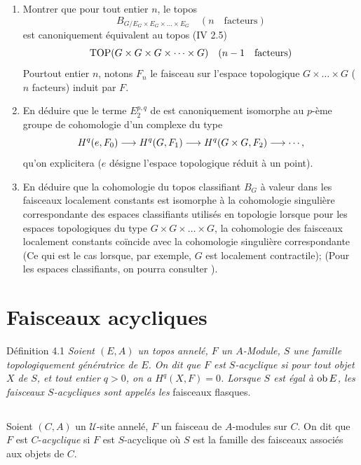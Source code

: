 \documentclass[10pt]{../fichiers-configuration-latex/smfart}
\begin{document}
\begin{enumerate}
\renewcommand{\labelenumi}{\theenumi)}
\item Montrer que pour tout entier $n$, le topos
$$
B_{G/ E_G \times E_G \times \ldots \times E_G}\quad (n\quad \mbox{facteurs})
$$
est canoniquement équivalent au topos (IV 2.5)
$$
\operatorname{TOP} (G \times G \times G \times \dots \times G)\quad (n - 1\quad
\mbox{facteurs})
$$
Pour\pageoriginale tout entier $n$, notons $F_n$ le faisceau sur l'espace
topologique $G \times \ldots \times G$ ($n$ facteurs) induit par $F$.

\item En déduire que le terme $E^{p, q}_2$ de  est
  canoniquement isomorphe au $p$-ème groupe de cohomologie d'un
  complexe du type
$$
H^{q}(e, F_{0}) \to H^{q}(G, F_1) \to H^{q}(G \times G, F_2) \to
\cdots {\quoi},
$$
qu'on explicitera ($e$ désigne l'espace topologique réduit à un
point).

\item En déduire que la cohomologie du topos classifiant $B_G$ à
  valeur dans les faisceaux localement constants est isomorphe à la
  cohomologie singulière correspondante des espaces classifiants utilisés en topologie lorsque pour les espaces topologiques du type $G \times G \times
  \ldots \times G$, la cohomologie des faisceaux localement constants
  coïncide avec la cohomologie singulière correspondante (Ce qui
  est le cas lorsque, par exemple, $G$ est localement contractile);
  (Pour les espaces classifiants, on pourra consulter \cite{SGA4-05:15}).
\end{enumerate}

\section{Faisceaux acycliques}

\begin{enonce*}{Définition 4.1}
\emph{Soient $(E, A)$ un topos annelé, $F$ un $A$-Module, $S$ une famille
topologiquement génératrice de $E$. On dit que $F$ est
$S$-acyclique si pour tout objet $X$ de $S$, et tout entier $q > 0$,
on a $H^q(X, F) = 0$. Lorsque $S$ est égal à $\operatorname{ob} E$, les faisceaux
$S$-acycliques sont appelés les} faisceaux flasques.
\end{enonce*}

\setcounter{subsection}{1}
\subsection{}
Soient $(C, A)$ un $𝒰$-site annelé, $F$ un faisceau de $A$-modules
sur $C$. On dit que $F$ est $C$-\emph{acyclique} si $F$ est $S$-acyclique
où $S$ est la famille des faisceaux associés aux objets de $C$.
\end{document}
